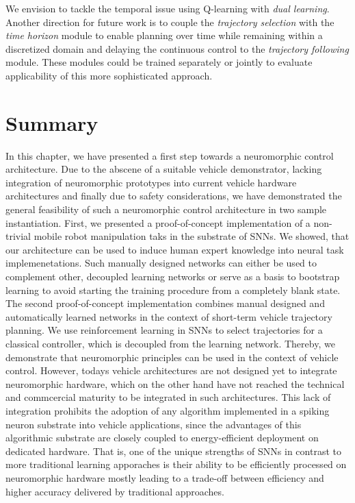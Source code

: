 We envision to tackle the temporal issue using Q-learning with \textit{dual learning}.
Another direction for future work is to couple the \emph{trajectory selection} with the \emph{time horizon} module to enable planning over time while remaining within a discretized domain and delaying the continuous control to the \emph{trajectory following} module.
These modules could be trained separately or jointly to evaluate applicability of this more sophisticated approach.


\section{Summary}%
\label{sec:summary_closed_loop_systems}

In this chapter, we have presented a first step towards a neuromorphic control architecture.
Due to the abscene of a suitable vehicle demonstrator, lacking integration of neuromorphic prototypes into current vehicle hardware architectures and finally due to safety considerations, we have demonstrated the general feasibility of such a neuromorphic control architecture in two sample instantiation.
First, we presented a proof-of-concept implementation of a non-trivial mobile robot manipulation taks in the substrate of \acp{SNN}.
We showed, that our architecture can be used to induce human expert knowledge into neural task implemenetations.
Such manually designed networks can either be used to complement other, decoupled learning networks or serve as a basis to bootstrap learning to avoid starting the training procedure from a completely blank state.
The second proof-of-concept implementation combines manual designed and automatically learned networks in the context of short-term vehicle trajectory planning.
We use reinforcement learning in \acp{SNN} to select trajectories for a classical controller, which is decoupled from the learning network.
Thereby, we demonstrate that neuromorphic principles can be used in the context of vehicle control.
However, todays vehicle architectures are not designed yet to integrate neuromorphic hardware, which on the other hand have not reached the technical and commcercial maturity to be integrated in such architectures.
This lack of integration prohibits the adoption of any algorithm implemented in a spiking neuron substrate into vehicle applications, since the advantages of this algorithmic substrate are closely coupled to energy-efficient deployment on dedicated hardware.
That is, one of the unique strengths of \acp{SNN} in contrast to more traditional learning apporaches is their ability to be efficiently processed on neuromorphic hardware mostly leading to a trade-off between efficiency and higher accuracy delivered by traditional approaches.


